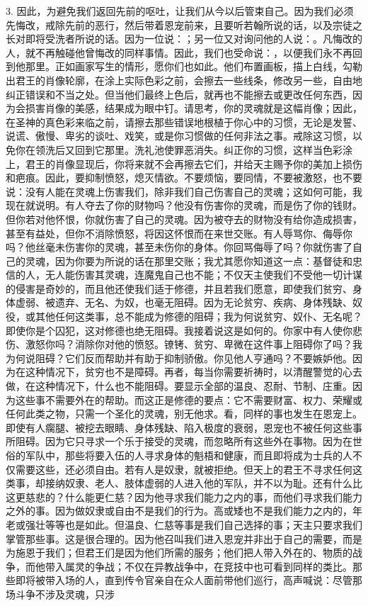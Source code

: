 3. 因此，为避免我们返回先前的呕吐，让我们从今以后管束自己。因为我们必须先悔改，戒除先前的恶行，然后带着恩宠前来，且要听若翰所说的话，以及宗徒之长对即将受洗者所说的话。因为一位说：；另一位又对询问他的人说：。凡悔改的人，就不再触碰他曾悔改的同样事情。因此，我们也受命说：，以便我们永不再回到他那里。正如画家写生的情形，愿你们也如此。他们布置画板，描上白线，勾勒出君王的肖像轮廓，在涂上实际色彩之前，会擦去一些线条，修改另一些，自由地纠正错误和不当之处。但当他们最终上色后，就再也不能擦去或更改任何东西，因为会损害肖像的美感，结果成为眼中钉。请思考，你的灵魂就是这幅肖像；因此，在圣神的真色彩来临之前，请擦去那些错误地根植于你心中的习惯，无论是发誓、说谎、傲慢、卑劣的谈吐、戏笑，或是你习惯做的任何非法之事。戒除这习惯，以免你在领洗后又回到它那里。洗礼池使罪恶消失。纠正你的习惯，这样当色彩涂上，君王的肖像显现后，你将来就不会再擦去它们，并给天主赐予你的美加上损伤和疤痕。因此，要抑制愤怒，熄灭情欲。不要烦恼，要同情，不要被激怒，也不要说：没有人能在灵魂上伤害我们，除非我们自己伤害自己的灵魂；这如何可能，我现在就说明。有人夺去了你的财物吗？他没有伤害你的灵魂，而是伤了你的钱财。但你若对他怀恨，你就伤害了自己的灵魂。因为被夺去的财物没有给你造成损害，甚至有益处，但你不消除愤怒，将因这怀恨而在来世交账。有人辱骂你、侮辱你吗？他丝毫未伤害你的灵魂，甚至未伤你的身体。你回骂侮辱了吗？你就伤害了自己的灵魂，因为你要为所说的话在那里交账；我尤其愿你知道这一点：基督徒和忠信的人，无人能伤害其灵魂，连魔鬼自己也不能；不仅天主使我们不受他一切计谋的侵害是奇妙的，而且他还使我们适于修德，并且若我们愿意，即使我们贫穷、身体虚弱、被遗弃、无名、为奴，也毫无阻碍。因为无论贫穷、疾病、身体残缺、奴役，或其他任何这类事，总不能成为修德的阻碍；我为何说贫穷、奴仆、无名呢？即使你是个囚犯，这对修德也绝无阻碍。我接着说这是如何的。你家中有人使你悲伤、激怒你吗？消除你对他的愤怒。镣铐、贫穷、卑微在这件事上阻碍你了吗？我为何说阻碍？它们反而帮助并有助于抑制骄傲。你见他人亨通吗？不要嫉妒他。因为在这种情况下，贫穷也不是障碍。再者，每当你需要祈祷时，以清醒警觉的心去做，在这种情况下，什么也不能阻碍。要显示全部的温良、忍耐、节制、庄重。因为这些事不需要外在的帮助。而这正是修德的要点：它不需要财富、权力、荣耀或任何此类之物，只需一个圣化的灵魂，别无他求。看，同样的事也发生在恩宠上。即使有人瘸腿、被挖去眼睛、身体残缺、陷入极度的衰弱，恩宠也不被任何这些事所阻碍。因为它只寻求一个乐于接受的灵魂，而忽略所有这些外在事物。因为在世俗的军队中，那些将要入伍的人寻求身体的魁梧和健康，而且即将成为士兵的人不仅需要这些，还必须自由。若有人是奴隶，就被拒绝。但天上的君王不寻求任何这类事，却接纳奴隶、老人、肢体虚弱的人进入他的军队，并不以为耻。还有什么比这更慈悲的？什么能更仁慈？因为他寻求我们能力之内的事，而他们寻求我们能力之外的事。因为做奴隶或自由不是我们的行为。高或矮也不是我们能力之内的，年老或强壮等等也是如此。但温良、仁慈等事是我们自己选择的事；天主只要求我们掌管那些事。这是很合理的。因为他召叫我们进入恩宠并非出于自己的需要，而是为施恩于我们；但君王们是因为他们所需的服务；他们把人带入外在的、物质的战争，而他带入属灵的争战；不仅在异教战争中，在竞技中也可看到同样的类比。那些即将被带入场的人，直到传令官亲自在众人面前带他们巡行，高声喊说：尽管那场斗争不涉及灵魂，只涉